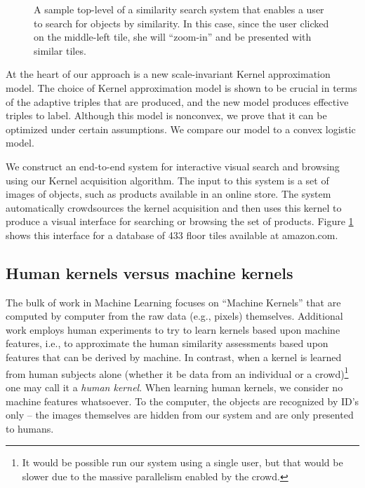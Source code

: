 \documentclass{article}
\begin{document}
\begin{figure}
 \caption{\label{fig:tilestree} A sample top-level of a similarity search system that enables a user to search for objects by similarity.  In this case, since the user clicked on the middle-left tile, she will ``zoom-in'' and be presented with similar tiles.}
\end{figure}

At the heart of our approach is a new scale-invariant Kernel approximation model.  The choice of Kernel approximation model is shown to be crucial in terms of the adaptive triples that are produced, and the new model produces effective triples to label.  Although this model is nonconvex, we prove that it can be optimized under certain assumptions.  We compare our model to a convex logistic model.

We construct an end-to-end system for interactive visual search and
browsing using our Kernel acquisition algorithm. The input to this
system is a set of images of objects, such as products available in an
online store. The system automatically crowdsources the kernel
acquisition and then uses this kernel to produce a visual interface
for searching or browsing the set of products. Figure
\ref{fig:tilestree} shows this interface for a database of 433 floor
tiles available at amazon.com.

\subsection{Human kernels versus machine kernels}
The bulk of work in Machine Learning focuses on ``Machine Kernels''
that are computed by computer from the raw data (e.g., pixels)
themselves.  Additional work employs human experiments to try to learn
kernels based upon machine features, i.e., to approximate the human
similarity assessments based upon features that can be derived by
machine.  In contrast, when a kernel is learned from human subjects
alone (whether it be data from an individual or a crowd)\footnote{It
  would be possible run our system using a single user, but that would
  be slower due to the massive parallelism enabled by the crowd.} one
may call it a {\em human kernel}.  When learning human kernels, we
consider no machine features whatsoever. To the computer, the objects
are recognized by ID's only -- the images themselves are hidden from
our system and are only presented to humans.
\end{document}
